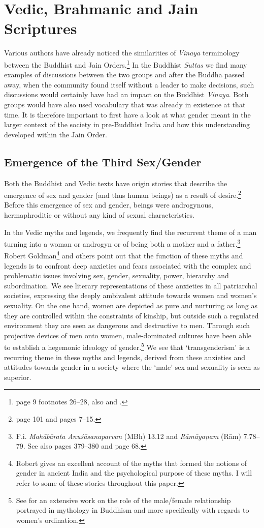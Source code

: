 \section{Vedic, Brahmanic and Jain Scriptures}

Various authors have already noticed the similarities of {\em Vinaya} terminology between the Buddhist and Jain Orders.\footnote{\cite{maes2016} page 9 footnotes 26–28, also \cite{sujato2009} and \cite{zwilling}.} In the Buddhist {\em Suttas} we find many examples of discussions between the two groups and after the Buddha passed away, when the community found itself without a leader to make decisions, such discussions would certainly have had an impact on the Buddhist {\em Vinaya}. Both groups would have also used vocabulary that was already in existence at that time. It is therefore important to first have a look at what gender meant in the larger context of the society in pre-Buddhist India and how this understanding developed within the Jain Order.

\subsection{Emergence of the Third Sex/Gender}
Both the Buddhist and Vedic texts have origin stories that describe the emergence of sex and gender (and thus human beings) as a result of desire.\footnote{\cite{zwilling2000} page 101 and \cite{artinger} pages 7–15.} Before this emergence of sex and gender, beings were androgynous, hermaphroditic or without any kind of sexual characteristics.

In the Vedic myths and legends, we frequently find the recurrent theme of a man turning into a woman or androgyn or of being both a mother and a father.\footnote{F.i. {\em Mahābārata Anuśāsanaparvan} (MBh) 13.12 and {\em Rāmāyaṇam} (Rām) 7.78–79. See also \cite{goldman} pages 379–380 and \cite{cassell} page 68.} Robert Goldman\footnote{Robert \cite{goldman} gives an excellent account of the myths that formed the notions of gender in ancient India and the psychological purpose of these myths. I will refer to some of these stories throughout this paper.} and others point out that the function of these myths and legends is to confront deep anxieties and fears associated with the complex and problematic issues involving sex, gender, sexuality, power, hierarchy and subordination. We see literary representations of these anxieties in all patriarchal societies, expressing the deeply ambivalent attitude towards women and women's sexuality. On the one hand, women are depicted as pure and nurturing as long as they are controlled within the constraints of kinship, but outside such a regulated environment they are seen as dangerous and destructive to men. Through such projective devices of men onto women, male-dominated cultures have been able to establish a hegemonic ideology of gender.\footnote{See \cite{sujato2011} for an extensive work on the role of the male/female relationship portrayed in mythology in Buddhism and more specifically with regards to women's ordination.} We see that `transgenderism' is a recurring theme in these myths and legends, derived from these anxieties and attitudes towards gender in a society where the `male' sex and sexuality is seen as superior.


